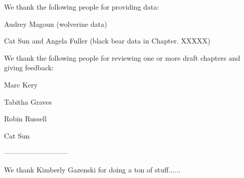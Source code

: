 We thank the following people for providing data:



Audrey Magoun (wolverine data)

Cat Sun and Angela Fuller (black bear data in Chapter. XXXXX)






We thank the following people for reviewing one or more draft chapters
and giving feedback:

Marc Kery

Tabitha Graves

Robin Russell

Cat Sun


---------------------------

We thank Kimberly Gazenski for doing a ton of stuff......


